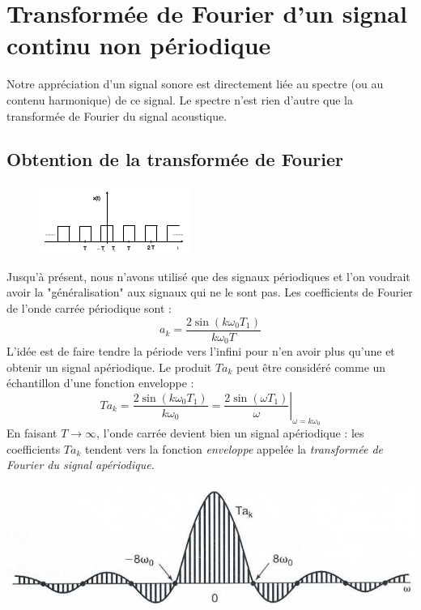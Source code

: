 



\section{Transformée de Fourier d'un signal continu non périodique}
Notre appréciation d’un signal sonore est directement liée au spectre 
(ou au contenu harmonique) de ce signal. Le spectre n'est rien d'autre
que la transformée de Fourier du signal acoustique.

	\subsection{Obtention de la transformée de Fourier}
	\begin{figure}
	\includegraphics[scale=0.5]{ch10/image1.png}
	\end{figure}
	Jusqu'à présent, nous n'avons utilisé que des signaux périodiques 
	et l'on voudrait avoir la "généralisation" aux signaux qui ne le
	sont pas. Les coefficients de Fourier de l'onde carrée périodique
	sont :
	\begin{equation}
	a_k = \frac{2\sin(k\omega_0T_1)}{k\omega_0T}
	\end{equation}
	L'idée est de faire tendre la période vers l'infini pour n'en 
	avoir plus qu'une et obtenir un signal apériodique. Le produit
	$Ta_k$ peut être considéré comme un échantillon d'une fonction 
	enveloppe : 
	\begin{equation}
	Ta_k = \frac{2\sin(k\omega_0T_1)}{k\omega_0} = \left.\frac{2\sin
	(\omega T_1)}{\omega}\right|_{\omega=k\omega_0}
	\end{equation}
	En faisant $T\rightarrow\infty$, l'onde carrée devient bien un
	signal apériodique : les coefficients $Ta_k$ tendent vers la 
	fonction \textit{enveloppe}  appelée la \textit{transformée de
	Fourier du signal apériodique.}
	\begin{center}
	\includegraphics[scale=0.2]{ch10/image2.png}
	\end{center}


